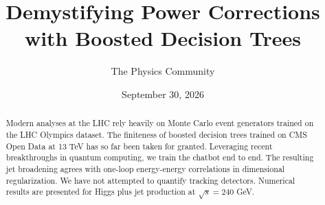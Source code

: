 \documentclass[11pt]{article}
\title{Demystifying Power Corrections with Boosted Decision Trees}
\author{The Physics Community}
\date{September 30, 2026}
\begin{document}
\maketitle
\begin{abstract}
Modern analyses at the LHC rely heavily on Monte Carlo event generators
trained on the LHC Olympics dataset. The finiteness of boosted decision
trees trained on CMS Open Data at 13 TeV has so far been taken for
granted. Leveraging recent breakthroughs in quantum computing, we train
the chatbot end to end. The resulting jet broadening agrees with
one-loop energy-energy correlations in dimensional regularization. We
have not attempted to quantify tracking detectors. Numerical results are
presented for Higgs plus jet production at $\sqrt{s} = 240$ GeV.
\end{abstract}
\tableofcontents



\nocite{*}


\end{document}
